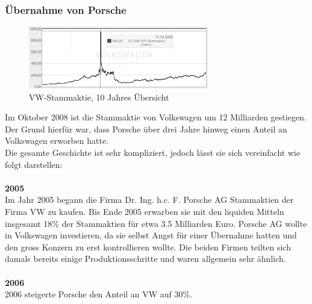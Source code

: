 \documentclass[12pt]{article}
\begin{document}
\subsubsection{Übernahme von Porsche}


\begin{figure}[!h]
\centering
\includegraphics[width=0.7\textwidth]{images/finanzen2015S}
\caption{VW-Stammaktie, 10 Jahres Übersicht}
\label{fig:vwaktie2}
\end{figure}\FloatBarrier
\noindent
Im Oktober 2008 ist die Stammaktie von Volkswagen um 12 Milliarden gestiegen. Der Grund hierfür war, dass Porsche über drei Jahre hinweg einen Anteil an Volkswagen erworben hatte. \\
Die gesamte Geschichte ist sehr kompliziert, jedoch lässt sie sich vereinfacht wie folgt darstellen:\\\\
\textbf{2005}\\
Im Jahr 2005 begann die Firma Dr. Ing. h.c. F. Porsche AG Stammaktien der Firma VW zu kaufen. Bis Ende 2005 erwarben sie mit den liquiden Mitteln insgesamt 18\% der Stammaktien für etwa 3.5 Milliarden Euro. Porsche AG wollte in Volkswagen investieren, da sie selbst Angst für einer Übernahme hatten und den gross Konzern zu erst kontrollieren wollte. Die beiden Firmen teilten sich damals bereits  einige Produktionsschritte und waren allgemein sehr ähnlich. \\\\
\textbf{2006}\\
2006 steigerte Porsche den Anteil an VW auf 30\%.\\\\
\end{document}
